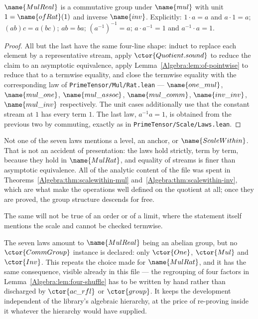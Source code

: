 \begin{theorem}\label{Algebra:thm:group}
$\name{MulReal}$ is a commutative group under $\name{mul}$ with unit
$1 = \name{ofRat}(1)$ and inverse $\name{inv}$.  Explicitly:
$1 \cdot a = a$ and $a \cdot 1 = a$; $(ab)c = a(bc)$; $ab = ba$;
$(a^{-1})^{-1} = a$; $a \cdot a^{-1} = 1$ and $a^{-1} \cdot a = 1$.
\end{theorem}

\begin{proof}
All but the last have the same four-line shape: induct to replace each element
by a representative stream, apply $\ctor{Quotient.sound}$ to reduce the claim
to an asymptotic equivalence, apply
Lemma~\ref{Algebra:lem:of-pointwise} to reduce that to a termwise equality, and
close the termwise equality with the corresponding law of
\texttt{PrimeTensor/Mul/Rat.lean} --- $\name{one\_mul}$, $\name{mul\_one}$,
$\name{mul\_assoc}$, $\name{mul\_comm}$, $\name{inv\_inv}$, $\name{mul\_inv}$
respectively.  The unit cases additionally use that the constant stream at $1$
has every term $1$.  The last law, $a^{-1}a = 1$, is obtained from the previous
two by commuting, exactly as in \texttt{PrimeTensor/Scale/Laws.lean}.
\end{proof}

\begin{remark}\label{Algebra:rem:no-analysis}
Not one of the seven laws mentions a level, an anchor, or
$\name{ScaleWithin}$.  That is not an accident of presentation: the laws hold
strictly, term by term, because they hold in $\name{MulRat}$, and equality of
streams is finer than asymptotic equivalence.  All of the analytic content of
the file was spent in
Theorems~\ref{Algebra:thm:scalewithin-mul} and~\ref{Algebra:thm:scalewithin-inv},
which are what make the operations well defined on the quotient at all; once
they are proved, the group structure descends for free.

The same will not be true of an order or of a limit, where the statement itself
mentions the scale and cannot be checked termwise.
\end{remark}

\begin{remark}
\label{Algebra:rem:no-instance}
The seven laws amount to $\name{MulReal}$ being an abelian group, but no
$\ctor{CommGroup}$ instance is declared: only $\ctor{One}$, $\ctor{Mul}$ and
$\ctor{Inv}$.  This repeats the choice made for $\name{MulRat}$, and it has the
same consequence, visible already in this file --- the regrouping of four
factors in Lemma~\ref{Algebra:lem:four-shuffle} has to be written by hand
rather than discharged by $\ctor{ac\_rfl}$ or $\ctor{group}$.  It keeps the
development independent of the library's algebraic hierarchy, at the price of
re-proving inside it whatever the hierarchy would have supplied.
\end{remark}

